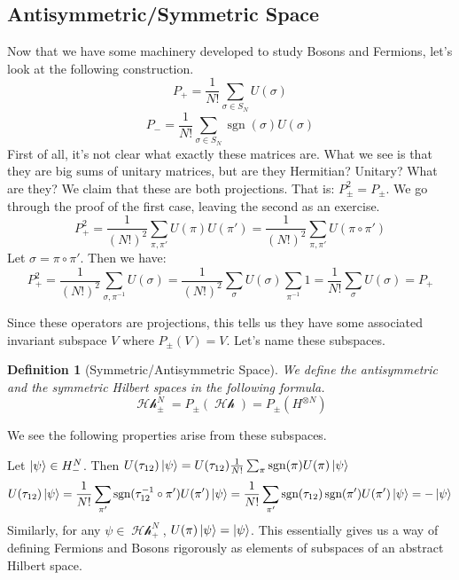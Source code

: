 \documentclass{article}
\DeclareMathOperator{\Hh}{\mathcal{Hh}}
\DeclareMathOperator{\sgn}{\textrm{sgn}}
\newtheorem{defn}{Definition}
\begin{document}
\subsection{Antisymmetric/Symmetric Space}
Now that we have some machinery developed to study Bosons and Fermions, let's look at the following construction.
\begin{equation}
P_{+} = \frac{1}{N!}\sum_{\sigma \in S_N} U(\sigma)
\end{equation}
\begin{equation}
P_{-} = \frac{1}{N!}\sum_{\sigma \in S_N} \sgn(\sigma) U(\sigma)
\end{equation}
First of all, it's not clear what exactly these matrices are. What we see is that they are big sums of unitary matrices, but are they Hermitian? Unitary? What are they? We claim that these are both projections. That is: $P_{\pm}^2 = P_{\pm}$. We go through the proof of the first case, leaving the second as an exercise.
\[P_+^2 = \frac{1}{(N!)^2} \sum_{\pi,\pi'}U(\pi)U(\pi') = \frac{1}{(N!)^2}\sum_{\pi,\pi'} U(\pi \circ \pi')\]
Let $\sigma = \pi\circ \pi'$. Then we have:
\[P_+^2 = \frac{1}{(N!)^2} \sum_{\sigma,\pi^{-1}}U(\sigma) = \frac{1}{(N!)^2}\sum_{\sigma}U(\sigma) \sum_{\pi^{-1}}1 = \frac{1}{N!}\sum_{\sigma} U(\sigma) = P_+\]

Since these operators are projections, this tells us they have some associated invariant subspace $V$ where $P_\pm (V) = V$. Let's name these subspaces.
\begin{defn}[Symmetric/Antisymmetric Space]
We define the antisymmetric and the symmetric Hilbert spaces in the following formula.
\begin{equation}
\Hh_\pm^N = P_\pm(\Hh) = P_\pm(H^{\otimes N})
\end{equation}
\end{defn}
We see the following properties arise from these subspaces. 

Let $\ket{\psi} \in H_-^N$. Then $U(\tau_{12}) \ket{\psi} = U(\tau_{12}) \frac{1}{N!}\sum_{\pi}\sgn(\pi)U(\pi) \ket{\psi}$
\[U(\tau_{12})\ket{\psi} = \frac{1}{N!}\sum_{\pi'}\sgn(\tau_{12}^{-1}\circ \pi')U(\pi') \ket{\psi} = \frac{1}{N!}\sum_{\pi'}\sgn(\tau_{12})\sgn(\pi')U(\pi')\ket{\psi}=-\ket{\psi}\] Similarly, for any $\psi \in \Hh_+^N$, $U(\pi)\ket{\psi} = \ket{\psi}$. This essentially gives us a way of defining Fermions and Bosons rigorously as elements of subspaces of an abstract Hilbert space.
\pagebreak




\end{document}

